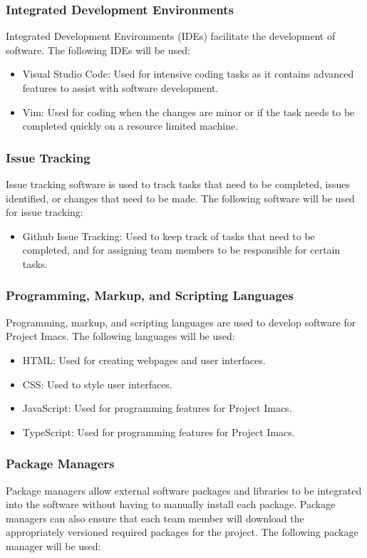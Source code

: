 \documentclass{article}
\begin{document}
\subsubsection{Integrated Development Environments}
Integrated Development Environments (IDEs) facilitate the development of software. The following IDEs will be used:

\begin{itemize}
\item Visual Studio Code: Used for intensive coding tasks as it contains advanced features to assist with software development.
\item Vim: Used for coding when the changes are minor or if the task needs to be completed quickly on a resource limited machine.
\end{itemize}

\subsubsection{Issue Tracking}
Issue tracking software is used to track tasks that need to be completed, issues identified, or changes that need to be made. The following software will be used for issue tracking:

\begin{itemize}
\item Github Issue Tracking: Used to keep track of tasks that need to be completed, and for assigning team members to be responsible for certain tasks.
\end{itemize}

\subsubsection{Programming, Markup, and Scripting Languages}
Programming, markup, and scripting languages are used to develop software for Project Imacs. The following languages will be used:

\begin{itemize}
\item HTML: Used for creating webpages and user interfaces.
\item CSS: Used to style user interfaces.
\item JavaScript: Used for programming features for Project Imacs.
\item TypeScript: Used for programming features for Project Imacs.
\end{itemize}

\subsubsection{Package Managers}
Package managers allow external software packages and libraries to be integrated into the software without having to manually install each package. Package managers can also ensure that each team member will download the appropriately versioned required packages for the project. The following package manager will be used:
\end{document}
